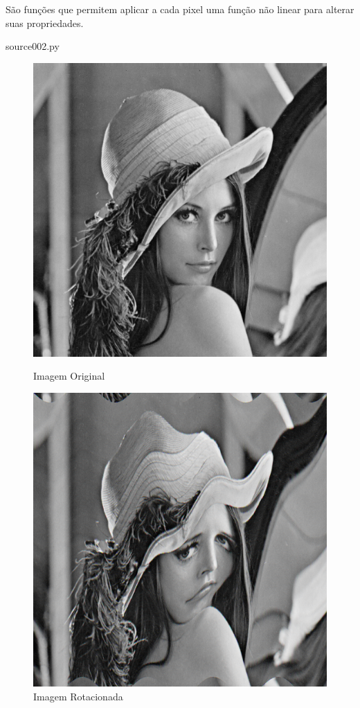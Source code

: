 \documentclass{article}
\begin{document}
São funções que permitem aplicar a cada pixel uma função não linear para alterar suas propriedades.

{source002.py}

\newpage

\begin{figure}[!htb]
\begin{minipage}[b]{0.45\linewidth}
\centering
\includegraphics[scale=0.32]{lena_B.png}
\caption{Imagem Original}
\label{fig:original}
\end{minipage}
\hspace{0.5cm}
\begin{minipage}[b]{0.45\linewidth}
\centering
\includegraphics[scale=0.32]{TransNaoLinearDistorcao.png}
\caption{Imagem Rotacionada}
\label{fig:rota}
\end{minipage}
\end{figure}
\end{document}
